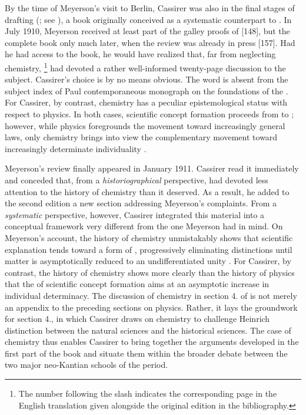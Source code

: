 \documentclass[submitted,12pt]{article}
\begin{document}
By the time of Meyerson’s visit to Berlin, Cassirer was also in the final stages of drafting \SFt (\cite{Cassirer1910}; see \cite{Heis2014a}), a book originally conceived as a systematic counterpart to \EPt. In July 1910, Meyerson received at least part of the galley proofs of \SFt {}[148], but the complete book only much later, when the review was already in press [157]. Had he had access to the book, he would have realized that, far from neglecting chemistry, \citet[270--92/203--20]{Cassirer1910}\footnote{The number following the slash indicates the corresponding page in the English translation given alongside the original edition in the bibliography.} had devoted a rather well-informed twenty-page discussion to the subject. Cassirer's choice is by no means obvious. The word  is absent from the subject index of Paul  contemporaneous  monograph on the foundations of the . For Cassirer, by contrast, chemistry has a peculiar epistemological status with respect to physics. In both cases, scientific concept formation proceeds from \SCs to \FCs; however, while physics foregrounds the movement toward increasingly general laws, only chemistry brings into view the complementary movement toward increasingly determinate individuality \citep[270--72/203--5; 289--93/217--21]{Cassirer1910}.


Meyerson’s review finally appeared in January 1911. Cassirer read it immediately and conceded that, from a \emph{historiographical} perspective, \EPt had devoted less attention to the history of chemistry than it deserved. As a result, he added to the second edition a new section addressing Meyerson's complaints. From a \emph{systematic} perspective, however, Cassirer integrated this material into a conceptual framework very different from the one Meyerson had in mind. On Meyerson’s account, the history of chemistry unmistakably shows that scientific explanation tends toward a form of  \citep[129]{Meyerson1911}, progressively eliminating distinctions until matter is asymptotically reduced to an undifferentiated unity \citep[see][ch.~]{Meyerson1908}. For Cassirer, by contrast, the history of chemistry shows more clearly than the history of physics that the  of scientific concept formation aims at an asymptotic increase in individual determinacy. The discussion of chemistry in section 4. of \SFt is not merely an appendix to the preceding sections on physics. Rather, it lays the groundwork for section 4., in which Cassirer draws on chemistry to challenge Heinrich  distinction between the  natural sciences and the  historical sciences. The case of chemistry thus enables Cassirer to bring together the arguments developed in the first part of the book and situate them within the broader debate between the two major neo-Kantian schools of the period.
\end{document}
